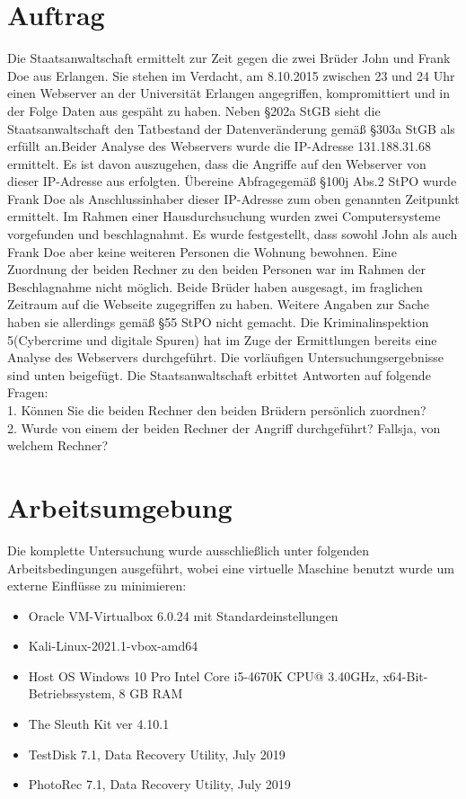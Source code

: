 \section{Auftrag}
Die Staatsanwaltschaft ermittelt zur Zeit gegen die zwei Brüder John und Frank Doe aus Erlangen. Sie stehen im Verdacht, am 8.10.2015 zwischen 23 und 24 Uhr einen Webserver an der Universität Erlangen angegriffen, kompromittiert und in der Folge Daten aus gespäht zu haben. Neben §202a StGB sieht die Staatsanwaltschaft den Tatbestand der Datenveränderung gemäß §303a StGB als erfüllt an.Beider Analyse des Webservers wurde die IP-Adresse 131.188.31.68 ermittelt. Es ist davon auszugehen, dass die Angriffe auf den Webserver von dieser IP-Adresse aus erfolgten. Übereine Abfragegemäß §100j Abs.2 StPO wurde Frank Doe als Anschlussinhaber dieser IP-Adresse zum oben genannten Zeitpunkt ermittelt. Im Rahmen einer Hausdurchsuchung wurden zwei Computersysteme vorgefunden und beschlagnahmt. Es wurde festgestellt, dass sowohl John als auch Frank Doe aber keine weiteren Personen die Wohnung bewohnen. Eine Zuordnung der beiden Rechner zu den beiden Personen war im Rahmen der Beschlagnahme nicht möglich. Beide Brüder haben ausgesagt, im fraglichen Zeitraum auf die Webseite zugegriffen zu haben. Weitere Angaben zur Sache haben sie allerdings gemäß §55 StPO nicht gemacht. Die Kriminalinspektion 5(Cybercrime und digitale Spuren) hat im Zuge der Ermittlungen bereits eine Analyse des Webservers durchgeführt. Die vorläufigen Untersuchungsergebnisse sind unten beigefügt. Die Staatsanwaltschaft erbittet Antworten auf folgende Fragen:\\
1. Können Sie die beiden Rechner den beiden Brüdern persönlich zuordnen?\\
2. Wurde von einem der beiden Rechner der Angriff durchgeführt? Fallsja, von welchem Rechner?

\section{Arbeitsumgebung}
Die komplette Untersuchung wurde ausschließlich unter folgenden Arbeitsbedingungen ausgeführt, wobei eine virtuelle Maschine benutzt wurde um externe Einflüsse zu minimieren:
\begin{itemize}
	\item Oracle VM-Virtualbox 6.0.24  mit Standardeinstellungen
	\item Kali-Linux-2021.1-vbox-amd64
	\item Host OS Windows 10 Pro Intel Core i5-4670K CPU@ 3.40GHz, x64-Bit-Betriebssystem, 8 GB RAM
	\item The Sleuth Kit ver 4.10.1
	\item TestDisk 7.1, Data Recovery Utility, July 2019
	\item PhotoRec 7.1, Data Recovery Utility, July 2019
\end{itemize}
